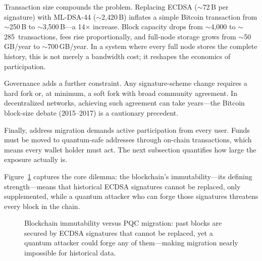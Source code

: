 Transaction size compounds the problem.  Replacing ECDSA ($\sim$72\,B per signature) with ML-DSA-44 ($\sim$2{,}420\,B) inflates a simple Bitcoin transaction from $\sim$250\,B to $\sim$3{,}500\,B---a 14$\times$ increase.  Block capacity drops from $\sim$4{,}000 to $\sim$285~transactions, fees rise proportionally, and full-node storage grows from $\sim$50\,GB/year to $\sim$700\,GB/year.  In a system where every full node stores the complete history, this is not merely a bandwidth cost; it reshapes the economics of participation.

Governance adds a further constraint.  Any signature-scheme change requires a hard fork or, at minimum, a soft fork with broad community agreement.  In decentralized networks, achieving such agreement can take years---the Bitcoin block-size debate (2015--2017) is a cautionary precedent.

Finally, address migration demands active participation from every user.  Funds must be moved to quantum-safe addresses through on-chain transactions, which means every wallet holder must act.  The next subsection quantifies how large the exposure actually is.

Figure~\ref{fig:ch14-blockchain-immutability} captures the core dilemma: the blockchain's immutability---its defining strength---means that historical ECDSA signatures cannot be replaced, only supplemented, while a quantum attacker who can forge those signatures threatens every block in the chain.

\begin{figure}[t]
\centering
{}
\caption{Blockchain immutability versus PQC migration: past blocks are secured by ECDSA signatures that cannot be replaced, yet a quantum attacker could forge any of them---making migration nearly impossible for historical data.}
\label{fig:ch14-blockchain-immutability}
\end{figure}

